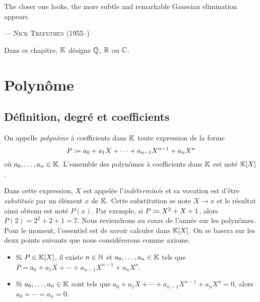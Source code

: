 \documentclass{magnolia}
\begin{document}
\setlength{}
\epigraph{\og The closer one looks, the more subtle and remarkable Gaussian elimination appears.\fg}{--- \textsc{Nick Trefethen (1955--)}}
\magtoc



\bigskip


Dans ce chapitre, $\mathbb{K}$ désigne $\mathbb{Q}$, $\mathbb{R}$ ou $\mathbb{C}$.

\section{Polynôme}
\subsection{Définition, degré et coefficients}

\begin{definition}
On appelle \emph{polynôme} à coefficients dans $\mathbb{K}$ toute expression de la forme
\[P\coloneqq a_0 + a_1 X + \cdots +  a_{n-1} X^{n-1} + a_n X^n\]
où $a_0,\ldots,a_n\in\mathbb{K}$. L'ensemble des polynômes à coefficients dans $\mathbb{K}$ est noté $\polyK$.
\end{definition}

\begin{remarques}
\remarque Dans cette expression, $X$ est appelée l'\emph{indéterminée} et sa vocation est d'être
  \emph{substituée} par un élément $x$ de $\mathbb{K}$. Cette substitution se note $X\to x$ et le
  résultat ainsi obtenu est noté $P(x)$. Par exemple, si $P\coloneqq X^2+X+1$, alors $P(2)=2^2+2+1=7$. 
\remarque Nous reviendrons au cours de l'année sur les polynômes.
  Pour le moment, l'essentiel est de savoir calculer dans $\polyK$. On se basera sur les
  deux points suivants que nous considérerons comme axiome.
\begin{itemize}
\item Si $P\in\polyK$, il existe $n\in\mathbb{N}$ et $a_0,\ldots,a_n\in\mathbb{K}$ tels que $P=a_0 + a_1 X + \cdots +  a_{n-1} X^{n-1} + a_n X^n$.
\item Si $a_0,\ldots,a_n\in\mathbb{K}$ sont tels que $a_0 + a_1 X + \cdots +  a_{n-1} X^{n-1} + a_n X^n=0$, alors $a_0=\cdots=a_n=0$.
\end{itemize}
\end{remarques}
\end{document}

